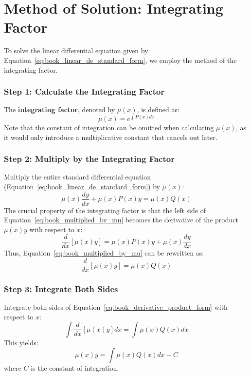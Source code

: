\documentclass[12pt, letterpaper]{book}
\begin{document}
\section{Method of Solution: Integrating Factor}
\label{sec:book_integrating_factor}
To solve the linear differential equation given by Equation~\ref{eq:book_linear_de_standard_form}, we employ the method of the integrating factor.

\subsubsection{Step 1: Calculate the Integrating Factor}
The \textbf{integrating factor}, denoted by $\mu(x)$, is defined as:
\begin{equation}
    \mu(x) = e^{\int P(x)dx}
    \label{eq:book_integrating_factor_formula}
\end{equation}
Note that the constant of integration can be omitted when calculating $\mu(x)$, as it would only introduce a multiplicative constant that cancels out later.

\subsubsection{Step 2: Multiply by the Integrating Factor}
Multiply the entire standard differential equation (Equation~\ref{eq:book_linear_de_standard_form}) by $\mu(x)$:
\begin{equation}
    \mu(x)\frac{dy}{dx} + \mu(x)P(x)y = \mu(x)Q(x)
    \label{eq:book_multiplied_by_mu}
\end{equation}
The crucial property of the integrating factor is that the left side of Equation~\ref{eq:book_multiplied_by_mu} becomes the derivative of the product $\mu(x)y$ with respect to $x$:
\begin{equation}
    \frac{d}{dx}[\mu(x)y] = \mu(x)P(x)y + \mu(x)\frac{dy}{dx}
\end{equation}
Thus, Equation~\ref{eq:book_multiplied_by_mu} can be rewritten as:
\begin{equation}
    \frac{d}{dx}[\mu(x)y] = \mu(x)Q(x)
    \label{eq:book_derivative_product_form}
\end{equation}

\subsubsection{Step 3: Integrate Both Sides}
Integrate both sides of Equation~\ref{eq:book_derivative_product_form} with respect to $x$:
\begin{equation}
    \int \frac{d}{dx}[\mu(x)y] dx = \int \mu(x)Q(x)dx
\end{equation}
This yields:
\begin{equation}
    \mu(x)y = \int \mu(x)Q(x)dx + C
    \label{eq:book_integrated_form}
\end{equation}
where $C$ is the constant of integration.
\end{document}
